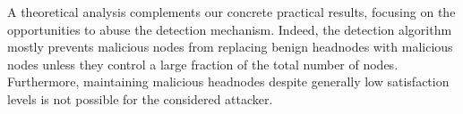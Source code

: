 A theoretical analysis complements our concrete practical results, focusing on the opportunities to abuse the detection mechanism. 
Indeed, the detection algorithm mostly prevents malicious nodes from replacing benign headnodes with malicious nodes unless they control a large fraction of the total number of nodes. 
Furthermore, maintaining malicious headnodes despite generally low satisfaction levels is not possible for the considered attacker. 
  



% 





 


